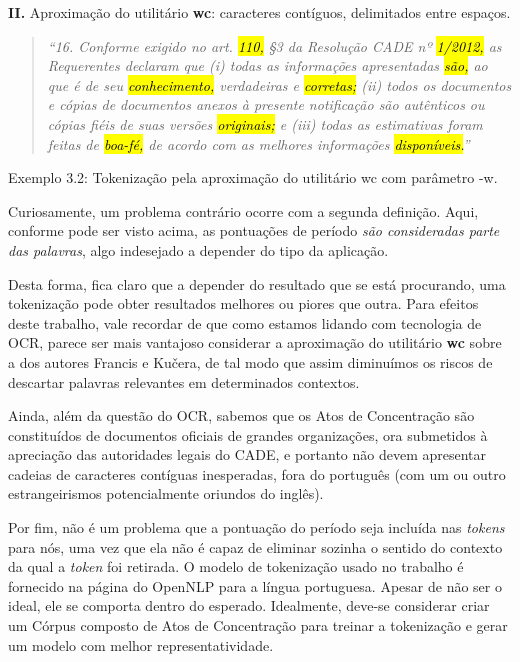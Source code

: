 \documentclass[11pt]{report}
\newcommand{\quotes}[1]{``#1''}
\begin{document}
\textbf{II.} Aproximação do utilitário \textbf{wc}: caracteres contíguos, delimitados entre espaços.

\begin{quote}
  \textit{\quotes{16. Conforme exigido no art. \hl{110,} §3 da Resolução CADE nº \hl{1/2012,} as Requerentes declaram que (i) todas as informações apresentadas \hl{\mbox{são,}} ao que é de seu
  \hl{conhecimento,} verdadeiras e \hl{corretas;} (ii) todos os documentos e cópias de documentos anexos à presente notificação são autênticos ou cópias fiéis de suas versões \hl{originais;}
  e (iii) todas as estimativas foram feitas de \hl{\mbox{boa-fé,}} de acordo com as melhores informações \hl{\mbox{disponíveis.}}}}
\end{quote}
\begin{center}
  Exemplo 3.2: Tokenização pela aproximação do utilitário wc com parâmetro -w.
\end{center}

Curiosamente, um problema contrário ocorre com a segunda definição. Aqui, conforme pode ser visto acima, as pontuações de período \textit{são consideradas parte das palavras}, algo
indesejado a depender do tipo da aplicação.

Desta forma, fica claro que a depender do resultado que se está procurando, uma tokenização pode obter resultados melhores ou piores que outra. Para efeitos deste trabalho,
vale recordar de que como estamos lidando com tecnologia de OCR, parece ser mais vantajoso considerar a aproximação do utilitário \textbf{wc} sobre a dos autores
Francis e Kučera, de tal modo que assim diminuímos os riscos de descartar palavras relevantes em determinados contextos.

Ainda, além da questão do OCR, sabemos que os Atos de Concentração são constituídos de documentos oficiais de grandes organizações, ora submetidos à apreciação das
autoridades legais do CADE, e portanto não devem apresentar cadeias de caracteres contíguas inesperadas, fora do português (com um ou outro estrangeirismos
potencialmente oriundos do inglês).

Por fim, não é um problema que a pontuação do período seja incluída nas \textit{tokens} para nós, uma vez que ela não é capaz de eliminar sozinha o sentido do contexto da qual
a \textit{token} foi retirada. O modelo de tokenização usado no trabalho é fornecido na página do OpenNLP para a língua portuguesa. Apesar de não ser o ideal, ele se comporta
dentro do esperado. Idealmente, deve-se considerar criar um Córpus composto de Atos de Concentração para treinar a tokenização e gerar um modelo com melhor representatividade.
\end{document}

